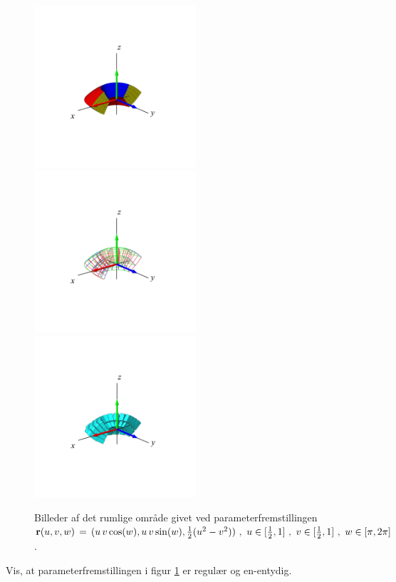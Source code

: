 \begin{figure}[h]
\centerline{\includegraphics[height=60mm]{FIGS/plotParab3D1}\includegraphics[height=60mm]{FIGS/plotParab3D2}  \includegraphics[height=60mm]{FIGS/plotParab3D3}}
\begin{center}
\caption{\small{Billeder af det rumlige område
givet ved parameterfremstillingen ${\bf r}(u, v,
w) \, = \, (u\,v\cos(w), u\,v\sin(w),
\frac{1}{2}(u^2 - v^2) ) \,\,, \,\, u \in
[\frac{1}{2}, 1 ]\,\, , \, \, v \in [\frac{1}{2},
1]\,\, , \, \, w \in [\pi, 2\pi] $.}} \label{fig3d13}
\end{center}
\end{figure}

\begin{exercise}
Vis, at parameterfremstillingen i figur \ref{fig3d13} er regulær og
en-entydig.
\end{exercise}



